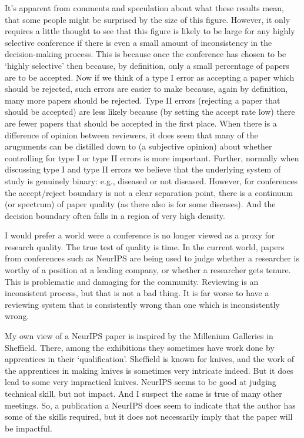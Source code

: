 It's apparent from comments and speculation about what these results
mean, that some people might be surprised by the size of this figure.
However, it only requires a little thought to see that this figure is
likely to be large for any highly selective conference if there is even
a small amount of inconsistency in the decision-making process. This is
because once the conference has chosen to be `highly selective' then
because, by definition, only a small percentage of papers are to be
accepted. Now if we think of a type I error as accepting a paper which
should be rejected, such errors are easier to make because, again by
definition, many more papers should be rejected. Type II errors
(rejecting a paper that should be accepted) are less likely because (by
setting the accept rate low) there are fewer papers that should be
accepted in the first place. When there is a difference of opinion
between reviewers, it does seem that many of the aruguments can be
distilled down to (a subjective opinion) about whether controlling for
type I or type II errors is more important. Further, normally when
discussing type I and type II errors we believe that the underlying
system of study is genuinely binary: e.g., diseased or not diseased.
However, for conferences the accept/reject boundary is not a clear
separation point, there is a continuum (or spectrum) of paper quality
(as there also is for some diseases). And the decision boundary often
falls in a region of very high density.

I would prefer a world were a conference is no longer viewed as a proxy
for research quality. The true test of quality is time. In the current
world, papers from conferences such as NeurIPS are being used to judge
whether a researcher is worthy of a position at a leading company, or
whether a researcher gets tenure. This is problematic and damaging for
the community. Reviewing is an inconsistent process, but that is not a
bad thing. It is far worse to have a reviewing system that is
consistently wrong than one which is inconsistently wrong.

My own view of a NeurIPS paper is inspired by the Millenium Galleries in
Sheffield. There, among the exhibitions they sometimes have work done by
apprentices in their `qualification'. Sheffield is known for knives, and
the work of the apprentices in making knives is sometimes very intricate
indeed. But it does lead to some very impractical knives. NeurIPS seems
to be good at judging technical skill, but not impact. And I suspect the
same is true of many other meetings. So, a publication a NeurIPS does
seem to indicate that the author has some of the skills required, but it
does not necessarily imply that the paper will be impactful.



